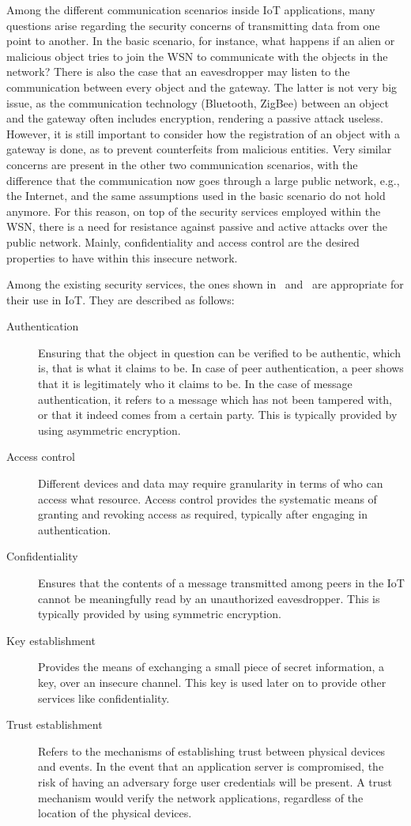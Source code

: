 \documentclass[12pt]{article}
\begin{document}
Among the different communication scenarios inside IoT applications, many questions arise regarding the security concerns of transmitting data from one point to another. In the basic scenario, for instance, what happens if an alien or malicious object tries to join the WSN to communicate with the objects in the network? There is also the case that an eavesdropper may listen to the communication between every object and the gateway. The latter is not very big issue, as the communication technology (Bluetooth, ZigBee) between an object and the gateway often includes encryption, rendering a passive attack useless. However, it is still important to consider how the registration of an object with a gateway is done, as to prevent counterfeits from malicious entities. Very similar concerns are present in the other two communication scenarios, with the difference that the communication now goes through a large public network, e.g., the Internet, and the same assumptions used in the basic scenario do not hold anymore. For this reason, on top of the security services employed within the WSN, there is a need for resistance against passive and active attacks over the public network. Mainly, confidentiality and access control are the desired properties to have within this insecure network.

Among the existing security services, the ones shown in~\cite{HELLAOUI2017173} and~\cite{ALABA201710} are appropriate for their use in IoT. They are described as follows: 

\begin{description}
\item [Authentication] Ensuring that the object in question can be verified to be authentic, which is, that is what it claims to be. In case of peer authentication, a peer shows that it is legitimately who it claims to be. In the case of message authentication, it refers to a message which has not been tampered with, or that it indeed comes from a certain party. This is typically provided by using asymmetric encryption.
\item [Access control] Different devices and data may require granularity in terms of who can access what resource. Access control provides the systematic means of granting and revoking access as required, typically after engaging in authentication.
\item [Confidentiality] Ensures that the contents of a message transmitted among peers in the IoT cannot be meaningfully read by an unauthorized eavesdropper. This is typically provided by using symmetric encryption.
\item [Key establishment] Provides the means of exchanging a small piece of secret information, a key, over an insecure channel. This key is used later on to provide other services like confidentiality.
\item [Trust establishment] Refers to the mechanisms of establishing trust between physical devices and events. In the event that an application server is compromised, the risk of having an adversary forge user credentials will be present. A trust mechanism would verify the network applications, regardless of the location of the physical devices. 
\end{description}
\end{document}
